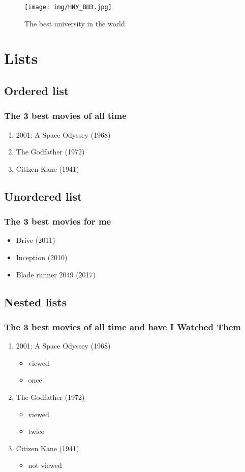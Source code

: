 \documentclass[14pt,a4paper]{report}
\begin{document}
\begin{figure}
\texttt{[image: img/НИУ\_ВШЭ.jpg]}
\caption{The best university in the world}
\label{fig:figure2}
\end{figure}

\chapter{Lists}

\section{Ordered list}
\subsection{The 3 best movies of all time}
\begin{enumerate}  
	\item 2001: A Space Odyssey (1968) 
	\item The Godfather (1972) 
	\item Citizen Kane (1941) 
\end{enumerate}

\section{Unordered list}
\subsection{The 3 best movies for me}
\begin{itemize}
	\item Drive (2011)
	\item Inception (2010)
	\item Blade runner 2049 (2017) 
\end{itemize}

\section{Nested lists}
\subsection{The 3 best movies of all time and have I Watched Them}
\begin{enumerate}  
	\item 2001: A Space Odyssey (1968)
	\begin{itemize}
	    \item viewed
	    \item once
	\end{itemize}
	\item The Godfather (1972) 
	\begin{itemize}
	    \item viewed
	    \item twice
	\end{itemize}
	\item Citizen Kane (1941)
	\begin{itemize}
	    \item not viewed
	\end{itemize}
\end{enumerate}
\end{document}
